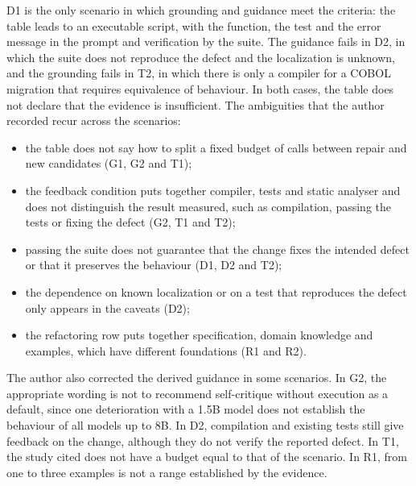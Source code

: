 D1 is the only scenario in which grounding and guidance meet the criteria: the table leads to an executable script, with the
function, the test and the error message in the prompt and verification by the suite. The guidance fails in D2, in which the
suite does not reproduce the defect and the localization is unknown, and the grounding fails in T2, in which there is only a compiler
for a COBOL migration that requires equivalence of behaviour. In both cases, the table does not declare that the
evidence is insufficient. The ambiguities that the author recorded recur across the scenarios:
\begin{itemize}
  \item the table does not say how to split a fixed budget of calls between repair and new candidates (G1, G2 and T1);
  \item the feedback condition puts together compiler, tests and static analyser and does not distinguish the result
  measured, such as compilation, passing the tests or fixing the defect (G2, T1 and T2);
  \item passing the suite does not guarantee that the change fixes the intended defect or that it preserves the behaviour
  (D1, D2 and T2);
  \item the dependence on known localization or on a test that reproduces the defect only appears in the caveats (D2);
  \item the refactoring row puts together specification, domain knowledge and examples, which have different foundations
  (R1 and R2).
\end{itemize}
The author also corrected the derived guidance in some scenarios. In G2, the appropriate wording is not to recommend
self-critique without execution as a default, since one deterioration with a 1.5B model does not establish the behaviour of all
models up to 8B. In D2, compilation and existing tests still give feedback on the change, although they do not verify
the reported defect. In T1, the study cited does not have a budget equal to that of the scenario. In R1, from one to three examples is not
a range established by the evidence.

